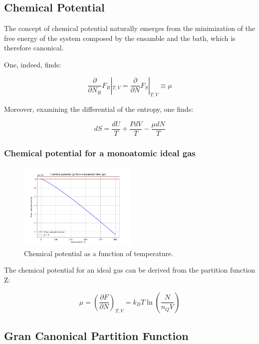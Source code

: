 \documentclass{article}
\begin{document}
\subsection{Chemical Potential}

The concept of chemical potential naturally emerges from the minimization of the free energy
of the system composed by the ensamble and the bath, which is therefore canonical.

One, indeed, finds:

\begin{equation}
    \frac{\partial}{\partial N_R}F_R|_{T,V}=\frac{\partial}{\partial N}F_S|_{T,V}\equiv \mu
\end{equation}

Moreover, examining the differential of the entropy, one finds:

\begin{equation}
    dS=\frac{dU}{T}+\frac{PdV}{T}-\frac{\mu dN}{T}
\end{equation}

\subsubsection{Chemical potential for a monoatomic ideal gas}

\begin{figure}[h!]
    \centering
    \includegraphics[width=0.5\textwidth]{images/mu-monoatomic-ideal-gas.png}
    \caption{Chemical potential as a function of temperature.}
    \label{fig:chemical-potential}
\end{figure}

The chemical potential for an ideal gas can be derived from the partition function Z:

\begin{equation}
    \mu=\left( \frac{\partial F}{\partial N} \right)_{T,V}=k_BT\ln{\left( \frac{N}{n_QV} \right)}
\end{equation}

\subsection{Gran Canonical Partition Function}
\end{document}
